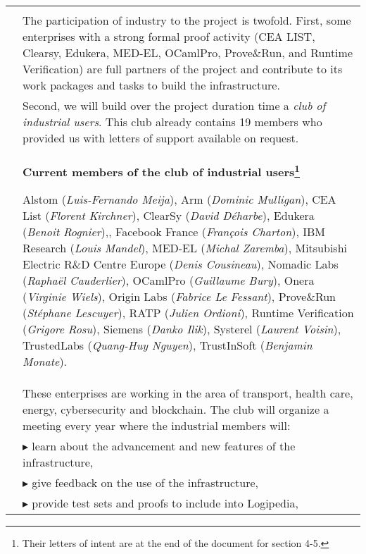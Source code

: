 \begin{longtable}{|p{}|p{}|}
&\\
&
\hspace{0.4cm}
The participation of industry to the project is twofold. First,
some enterprises with a strong formal proof activity (CEA
LIST, Clearsy, Edukera, MED-EL, OCamlPro, Prove\&Run, 
and Runtime Verification) are full partners of the project and
contribute to its work packages and tasks to build the
infrastructure.
\\
&
\hspace{0.4cm}
Second, we will build over the project duration time a {\em club of
  industrial users}. This club already contains
19 members who provided us with letters of support available on request.
\\
&
\hspace{0.4cm}
\definecolor{shadecolor}{named}{color1}
\begin{shaded}
\begin{center}
  {\bf\large Current members of the club of industrial users\footnote{Their letters of intent are at the end of the document for section 4-5.}}
\end{center}
Alstom ({\it Luis-Fernando Meija}),
Arm ({\it Dominic Mulligan}),
CEA List ({\it Florent Kirchner}),
ClearSy ({\it David Déharbe}),
Edukera ({\it Benoit Rognier}),,
Facebook France ({\it François Charton}),
IBM Research ({\it Louis Mandel}),
MED-EL ({\it Michal Zaremba}),
Mitsubishi Electric R\&D Centre Europe ({\it Denis Cousineau}),
Nomadic Labs ({\it  Raphaël Cauderlier}),
OCamlPro ({\it Guillaume Bury}),
Onera ({\it Virginie Wiels}),
Origin Labs ({\it Fabrice Le Fessant}),
Prove\&Run ({\it Stéphane Lescuyer}),
RATP ({\it Julien Ordioni}),
Runtime Verification ({\it Grigore Rosu}),
Siemens ({\it Danko Ilik}),
Systerel ({\it Laurent Voisin}),
TrustedLabs ({\it Quang-Huy Nguyen}),
TrustInSoft ({\it Benjamin Monate}).
\end{shaded}\\
&
\hspace{0.4cm}
These enterprises are working in the area of transport, health
care, energy, cybersecurity and blockchain.
The club will organize a meeting every year where the
industrial members will:\\
&
$\blacktriangleright$
learn about the advancement and new features of the infrastructure,\\
&
$\blacktriangleright$
give feedback on the use of the infrastructure,
\\
&
$\blacktriangleright$ provide test sets and proofs to include into Logipedia,

\end{longtable}
